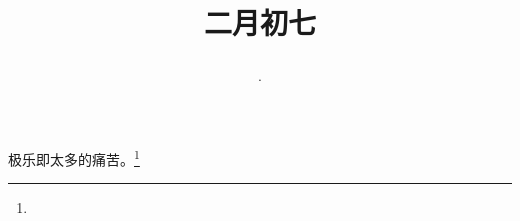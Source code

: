 \title{\date[d=16,m=3,y=2024][year:cn-y,年,month:cn,day:cn,日,·,weekday]·二月初七 }
极乐即太多的痛苦。\footnote{ }

